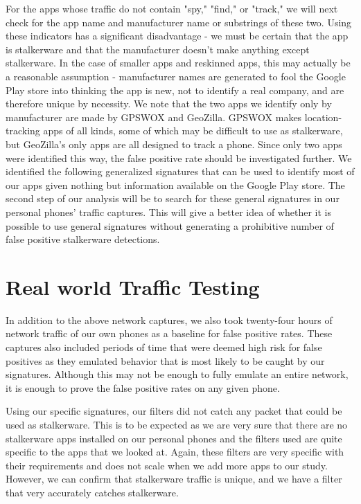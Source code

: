 \documentclass[acmtog]{acmart}
\begin{document}
For the apps whose traffic do not contain "spy," "find," or "track," we will 
next check for the app name and manufacturer name or substrings of these two. 
Using these indicators has a significant disadvantage - we must be certain that 
the app is stalkerware and that the manufacturer doesn't make anything except 
stalkerware. In the case of smaller apps and reskinned apps, this may actually 
be a reasonable assumption - manufacturer names are generated to fool the 
Google Play store into thinking the app is new, not to identify a real company, 
and are therefore unique by necessity. We note that the two apps we identify 
only by manufacturer are made by GPSWOX and GeoZilla. GPSWOX makes 
location-tracking apps of all kinds, some of which may be difficult to use as 
stalkerware, but GeoZilla's only apps are all designed to track a phone. Since 
only two apps were identified this way, the false positive rate should be 
investigated further.
We identified the following generalized signatures that can be used to identify 
most of our apps given nothing but information available on the Google Play 
store. The second step of our analysis will be to search for these general 
signatures in our personal phones' traffic captures. This will give a better 
idea of whether it is possible to use general signatures without generating a 
prohibitive number of false positive stalkerware detections.


\section{Real world Traffic Testing}

In addition to the above network captures, we also took twenty-four hours of 
network traffic of our own phones as a baseline for false positive rates. These 
captures also included periods of time that were deemed high risk for false 
positives as they emulated behavior that is most likely to be caught by our 
signatures. Although this may not be enough to fully emulate an entire network, 
it is enough to prove the false positive rates on any given phone.

Using our specific signatures, our filters did not catch any packet that could be used as stalkerware. This is to be expected as we are very sure that there are no stalkerware apps installed on our personal phones and the filters used are quite specific to the apps that we looked at. Again, these filters are very specific with their requirements and does not scale when we add more apps to our study. However, we can confirm that stalkerware traffic is unique, and we have a filter that very accurately catches stalkerware.
\end{document}
